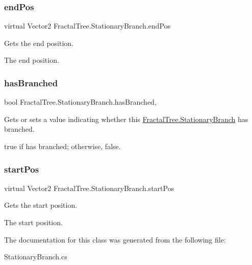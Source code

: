 \subsubsection{\texorpdfstring{end\+Pos}{endPos}}
{\footnotesize\ttfamily virtual Vector2 Fractal\+Tree.\+Stationary\+Branch.\+end\+Pos\hspace{0.3cm}{\ttfamily [get]}}



Gets the end position. 

The end position.\hypertarget{class_fractal_tree_1_1_stationary_branch_aabe8c4ecdd2bcfda07911f37f171e399}{}\label{class_fractal_tree_1_1_stationary_branch_aabe8c4ecdd2bcfda07911f37f171e399} 
\subsubsection{\texorpdfstring{has\+Branched}{hasBranched}}
{\footnotesize\ttfamily bool Fractal\+Tree.\+Stationary\+Branch.\+has\+Branched\hspace{0.3cm}{\ttfamily [get]}, {\ttfamily [set]}}



Gets or sets a value indicating whether this \hyperlink{class_fractal_tree_1_1_stationary_branch}{Fractal\+Tree.\+Stationary\+Branch} has branched. 

{\ttfamily true} if has branched; otherwise, {\ttfamily false}.\hypertarget{class_fractal_tree_1_1_stationary_branch_a536f1353b6c082d193a12efa88ed3239}{}\label{class_fractal_tree_1_1_stationary_branch_a536f1353b6c082d193a12efa88ed3239} 
\subsubsection{\texorpdfstring{start\+Pos}{startPos}}
{\footnotesize\ttfamily virtual Vector2 Fractal\+Tree.\+Stationary\+Branch.\+start\+Pos\hspace{0.3cm}{\ttfamily [get]}}



Gets the start position. 

The start position.

The documentation for this class was generated from the following file\+:\begin{DoxyCompactItemize}
\item 
Stationary\+Branch.\+cs\end{DoxyCompactItemize}
